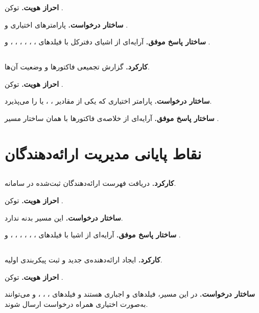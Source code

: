 \textbf{احراز هویت.} توکن .

\textbf{ساختار درخواست.} پارامترهای اختیاری  و .

\textbf{ساختار پاسخ موفق.} آرایه‌ای از اشیای دفترکل با فیلدهای ،
، ، ، ،
،  و .

\subsection{}
\textbf{کارکرد.} گزارش تجمیعی فاکتورها و وضعیت آن‌ها.

\textbf{احراز هویت.} توکن .

\textbf{ساختار درخواست.} پارامتر اختیاری  که یکی از مقادیر
، ،  یا  را می‌پذیرد.

\textbf{ساختار پاسخ موفق.} آرایه‌ای از خلاصه‌ی فاکتورها با همان ساختار
مسیر .

\section{نقاط پایانی مدیریت ارائه‌دهندگان}

\subsection{}
\textbf{کارکرد.} دریافت فهرست ارائه‌دهندگان ثبت‌شده در سامانه.

\textbf{احراز هویت.} توکن .

\textbf{ساختار درخواست.} این مسیر بدنه ندارد.

\textbf{ساختار پاسخ موفق.} آرایه‌ای از اشیا با فیلدهای ،
، ، ، ،
،  و .

\subsection{}
\textbf{کارکرد.} ایجاد ارائه‌دهنده‌ی جدید و ثبت پیکربندی اولیه.

\textbf{احراز هویت.} توکن .

\textbf{ساختار درخواست.} در این مسیر، فیلدهای  و
 اجباری هستند و فیلدهای ، ،
،  و  می‌توانند به‌صورت
اختیاری همراه درخواست ارسال شوند.

